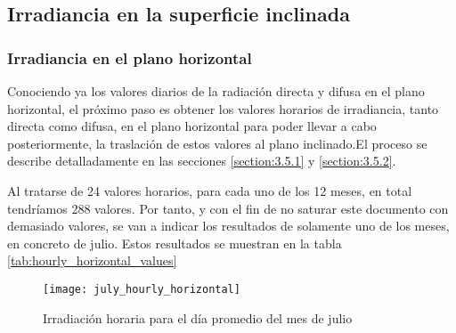 \subsection{Irradiancia en la superficie inclinada}

\subsubsection{Irradiancia en el plano horizontal}
Conociendo ya los valores diarios de la radiación directa y difusa en el plano horizontal, el próximo paso es obtener los valores horarios de irradiancia, tanto directa como difusa, en el plano horizontal para poder llevar a cabo posteriormente, la traslación de estos valores al plano inclinado.El proceso se describe detalladamente en las secciones \ref{section:3.5.1} y \ref{section:3.5.2}.

Al tratarse de 24 valores horarios, para cada uno de los 12 meses, en total tendríamos 288 valores. Por tanto, y con el fin de no saturar este documento con demasiado valores, se van a indicar los resultados de solamente uno de los meses, en concreto de julio. Estos resultados se muestran en la tabla \ref{tab:hourly_horizontal_values}

\begin{figure}[H]
\texttt{[image: july\_hourly\_horizontal]}
\centering
\caption{Irradiación horaria para el día promedio del mes de julio}
\label{fig:hourly_horizontal_values}
\end{figure}

